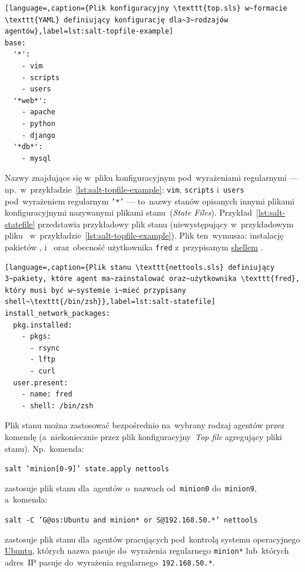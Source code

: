 \documentclass[thesis]{subfiles}
\begin{document}
\begin{lstlisting}[language=,caption={Plik konfiguracyjny \texttt{top.sls} w~formacie \texttt{YAML} definiujący konfigurację dla~3~rodzajów agentów},label=lst:salt-topfile-example]
base:
  '*':
    - vim
    - scripts
    - users
  '*web*':
    - apache
    - python
    - django
  '*db*':
    - mysql
\end{lstlisting}
Nazwy znajdujące się w~pliku konfiguracyjnym pod~wyrażeniami regularnymi --- np.~w~przykładzie~\ref{lst:salt-topfile-example}: \texttt{vim}, \texttt{scripts} i~\texttt{users} pod~wyrażeniem regularnym \texttt{'*'} --- to~nazwy stanów opisanych innymi plikami konfiguracyjnymi nazywanymi plikami stanu~(\emph{State Files}). Przykład~\ref{lst:salt-statefile} przedstawia przykładowy plik stanu  (niewystępujący w~przykładowym pliku~ w~przykładzie~\ref{lst:salt-topfile-example}). Plik ten~wymusza: instalację pakietów ,  i~ oraz~obecność użytkownika \texttt{fred} z~przypisanym \href{https://superuser.com/questions/144666/what-is-the-difference-between-shell-console-and-terminal}{shellem} \href{https://en.wikipedia.org/wiki/Z_shell}{}.

\begin{lstlisting}[language=,caption={Plik stanu \texttt{nettools.sls} definiujący 3~pakiety, które agent ma~zainstalować oraz~użytkownika \texttt{fred}, który musi być w~systemie i~mieć przypisany shell~\texttt{/bin/zsh}},label=lst:salt-statefile]
install_network_packages:
  pkg.installed:
    - pkgs:
      - rsync
      - lftp
      - curl
  user.present:
    - name: fred
    - shell: /bin/zsh
\end{lstlisting}

Plik stanu można zastosować bezpośrednio na~wybrany rodzaj agentów przez komendę (a~niekoniecznie przez plik konfiguracyjny~\emph{Top file} agregujący pliki stanu). Np.~komenda:\mynobreakpar
\begin{center}
\texttt{salt 'minion[0-9]' state.apply nettools}
\end{center}
zastosuje plik stanu  dla~agentów o~nazwach od~\texttt{minion0} do~\texttt{minion9}, a~komenda:\mynobreakpar
\begin{center}
\texttt{salt -C 'G@os:Ubuntu and minion* or S@192.168.50.*' nettools}
\end{center}
zastosuje plik stanu  dla~agentów pracujących pod~kontrolą systemu operacyjnego \href{https://en.wikipedia.org/wiki/Ubuntu_(operating_system)}{Ubuntu}, których nazwa pasuje do~wyrażenia regularnego \texttt{minion*} lub~których adres~IP pasuje do~wyrażenia regularnego~\texttt{192.168.50.*}.
\end{document}
